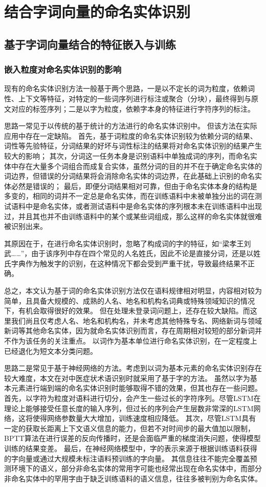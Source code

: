 \chapter{结合字词向量的命名实体识别}
\section{基于字词向量结合的特征嵌入与训练}
\subsection{嵌入粒度对命名实体识别的影响}
\label{subsec:analyze}
现有的命名实体识别方法一般基于两个思路，一是以不定长的词为粒度，依赖词性、上下文等特征，对特定的一些词序列进行标注或聚合（分块），最终得到与原文对应的标签序列；二是以字为粒度，依赖字本身的特征进行字符序列的标注。

思路一常见于以传统的基于统计的方法进行的命名实体识别中。
但该方法在实际应用中存在一定缺陷。
首先，基于词粒度的命名实体识别较为依赖分词的结果、词性等先验特征，分词结果的好坏与词性标注的结果将对命名实体识别的结果产生较大的影响；
其次，分词这一任务本身是识别语料中单独成词的序列，而命名实体中存在大量多个词组合而成复合实体，虽然分词的目的并不在于确定命名实体的词边界，但错误的分词结果将会消除命名实体的词边界，在此基础上识别的命名实体必然是错误的；
最后，即便分词结果相对可靠，但由于命名实体本身的结构是多变的，相同的词并不一定总是命名实体，而在训练语料中未被单独分出的词在测试语料中是命名实体，或者测试语料中是命名实体的序列根本未在训练语料中出现过，并且其也并不由训练语料中的某个或某些词组成，那么这样的命名实体就很难被识别出来。

其原因在于，在进行命名实体识别时，忽略了构成词的字的特征，如“梁孝王刘武……”，由于该序列中存在四个常见的人名姓氏，因此不论是直接分词，还是以姓氏字典作为触发字的识别，在这种情况下都会受到严重干扰，导致最终结果不正确。

总之，本文认为基于词的命名实体识别方法仅在语料规律相对明显，内容相对较为简单，且具备大规模的、成熟的人名、地名和机构名词典或特殊领域知识的情况下，有机会取得很好的效果。
但在处理未登录词问题上，还存在较大缺陷。而这里我们尚且仅考虑人名、地名和机构名，并未考虑其他特殊专名、网络新词与领域新词等其他命名实体，因为就命名实体识别而言，存在周期相对较短的部分新词并不作为该任务的关注重点。
以词作为基本单位进行命名实体识别，在一定程度上已经退化为短文本分类问题。

思路二是常见于基于神经网络的方法。考虑到以词为基本元素的命名实体识别存在较大难度，本文在对中医症状术语识别时就采用了基于字的方法。
虽然以字为基本元素进行端到端的命名实体识别时能够取得不错的效果，但其也存在一些问题。
首先，以字符为粒度对语料进行切分，会产生一些过长的字符序列。尽管LSTM在理论上能够接受任意长度的输入序列，但过长的序列会产生层数非常深的LSTM网络，这将使得网络参数量大大增加，训练速度相应降低。
其次，尽管LSTM具有一定的获取长距离上下文语义信息的能力，但若不对时间步的最大值加以限制，BPTT算法在进行误差的反向传播时，还是会面临严重的梯度消失问题，使得模型训练的结果变差。
最后，在神经网络模型中，字的表示来源于根据训练语料获得的字向量或通过大规模未标注语料预训练的字向量。
其信息往往不能完全覆盖预测环境下的语义，部分非命名实体的常用字可能也经常出现在命名实体中，而部分非命名实体中的罕用字由于缺乏训练语料的语义信息，往往多被判别为命名实体。

